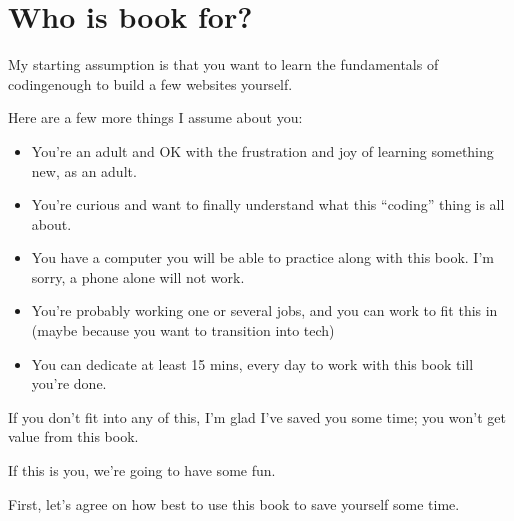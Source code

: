\section{Who is book for?}\label{sec:how-is-book-for?}
My starting assumption is that you want to learn the fundamentals of coding\textemdash enough to build a few websites yourself.

Here are a few more things I assume about you:
\begin{itemize}
    \item You're an adult and OK with the frustration and joy of learning something new, as an adult.
    \item You're curious and want to finally understand what this ``coding'' thing is all about.
    \item You have a computer you will be able to practice along with this book.
    I'm sorry, a phone alone will not work.
    \item You're probably working one or several jobs, and you can work to fit this in
    (maybe because you want to transition into tech)
    \item You can dedicate at least 15 mins, every day to work with this book till you're done.
\end{itemize}

If you don't fit into any of this, I'm glad I've saved you some time; you won't get value from this book.

If this is you, we're going to have some fun.

First, let's agree on how best to use this book to save yourself some time.

